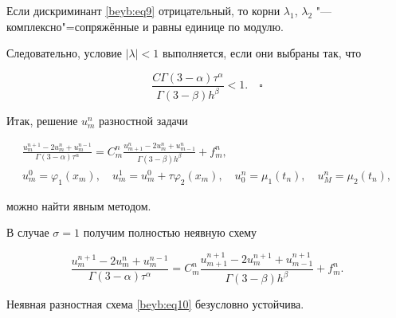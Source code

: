 Если дискриминант \eqref{beyb:eq9} отрицательный, то корни $\lambda _1$, $\lambda _2 $ "--- комплексно"=сопряжённые и равны единице по модулю.

Следовательно, условие $| \lambda |<1$ выполняется, если они выбраны так, что

$$

\frac{C\Gamma (3-\alpha )\tau ^\alpha }{\Gamma (3-\beta

)h^\beta }<1. \quad \square

$$



\smallskip



Итак, решение $u_m^n $ разностной задачи

\begin{gather*}

\frac{u_m^{n+1} -2u_m^n +u_m^{n-1} }{\Gamma (3-\alpha )\tau ^\alpha }=C_m^n

 \frac{u_{m+1}^n -2u_m^n +u_{m-1}^n }{\Gamma (3-\beta )h^\beta }+f_m^n,\\

u_m^0 =\varphi _1 (x_m ), \quad   u_m^1 =u_m^0 +\tau \varphi _2 (x_m ), \quad

 u_0^n =\mu _1 (t_n ), \quad   u_M^n =\mu _2 (t_n ),

\end{gather*}

можно найти явным методом.



\smallskip



В случае $\sigma =1$ получим полностью неявную схему

\begin{equation}

\label{beyb:eq10}

\frac{u_m^{n+1} -2u_m^n +u_m^{n-1}}{\Gamma (3-\alpha )\tau ^\alpha }=C_m^n

 \frac{u_{m+1}^{n+1} -2u_m^{n+1} +u_{m-1}^{n+1} }{\Gamma (3-\beta

 )h^\beta }+f_m^n.

\end{equation}





\begin{theorem}[2]

Неявная разностная схема \eqref{beyb:eq10} безусловно устойчива.

\end{theorem}



